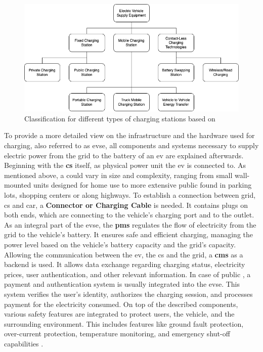 \begin{figure}[!ht]
\centering
\includegraphics[scale=0.4]{resources/images/main/1_fundamentals/ChargingStationClassification.png}
\caption{Classification for different types of charging stations based on \cite{afshar_literature_2020}}
\label{fig:charging-station-classification}
\end{figure}

\noindent To provide a more detailed view on the infrastructure and the hardware used for charging, also referred to as \acrfull{evse}, all components and systems necessary to supply electric power from the grid to the battery of an \acrfull{ev} are explained afterwards.
Beginning with the \textbf{\acrfull{cs}} itself, as physical power unit the \acrshort{ev} is connected to. As mentioned above, a  could vary in size and complexity, ranging from small wall-mounted units designed for home use to more extensive public  found in parking lots, shopping centers or along highways. 
To establish a connection between grid, \acrshort{cs} and car, a \textbf{Connector or Charging Cable} is needed. It contains plugs on both ends, which are connecting to the vehicle's charging port and to the  outlet. 
As an integral part of the \acrshort{evse}, the \textbf{\acrshort{pms}} regulates the flow of electricity from the grid to the vehicle's battery. It ensures safe and efficient charging, managing the power level based on the vehicle's battery capacity and the grid's capacity.
Allowing the communication between the \acrshort{ev}, the \acrfull{cs} and the grid, a \textbf{\acrshort{cms}} as a backend is used. It allows data exchange regarding charging status, electricity prices, user authentication, and other relevant information.
In case of public , a payment and authentication system is usually integrated into the \acrshort{evse}. This system verifies the user's identity, authorizes the charging session, and processes payment for the electricity consumed.
On top of the described components, various safety features are integrated to protect users, the vehicle, and the surrounding environment. This includes features like ground fault protection, over-current protection, temperature monitoring, and emergency shut-off capabilities \cite{littlefuse_designing_2020}.

